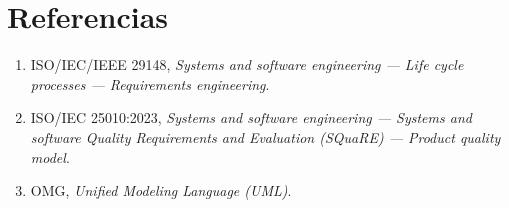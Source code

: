 \documentclass[12pt,a4paper]{article}
\begin{document}
\section{Referencias}

\begin{enumerate}
    \item ISO/IEC/IEEE 29148, \textit{Systems and software engineering — Life cycle processes — Requirements engineering}.
    
    \item ISO/IEC 25010:2023, \textit{Systems and software engineering — Systems and software Quality Requirements and Evaluation (SQuaRE) — Product quality model}.
    
    \item OMG, \textit{Unified Modeling Language (UML)}.
\end{enumerate}
\end{document}
